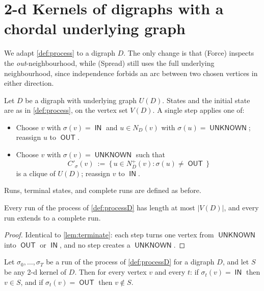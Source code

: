 \documentclass[11pt]{article}
\numberwithin{equation}{section}
\theoremstyle{plain}
\newcommand{\V}{V}
\newcommand{\Np}{N^{+}}
\newcommand{\und}{U}                       %
\newcommand{\st}{\sigma}                   %
\DeclareMathOperator{\IN}{\mathsf{IN}}
\DeclareMathOperator{\OUT}{\mathsf{OUT}}
\DeclareMathOperator{\UNK}{\mathsf{UNKNOWN}}
\begin{document}
\section{2-d Kernels of digraphs with a chordal underlying graph}
\label{sec:chordaldigraph}

We adapt \cref{def:process} to a digraph $D$. The only change is that (Force) inspects
the \emph{out}-neighbourhood, while (Spread) still uses the full underlying
neighbourhood, since independence forbids an arc between two chosen vertices in either
direction.

\begin{definition}\label{def:processD}
Let $D$ be a digraph with underlying graph $\und(D)$. States and the initial state are
as in \cref{def:process}, on the vertex set $\V(D)$. A single step applies one of:
\begin{itemize}[leftmargin=1.6em,itemsep=0.4ex]
\item[\textbf{(Spread$'$)}] Choose $v$ with $\st(v)=\IN$ and $u\in N_D(v)$ with
$\st(u)=\UNK$; reassign $u$ to $\OUT$.
\item[\textbf{(Force$'$)}] Choose $v$ with $\st(v)=\UNK$ such that
\[
  C'_\st(v)\ :=\ \{\,u\in \Np_D(v):\st(u)\neq\OUT\,\}
\]
is a clique of $\und(D)$; reassign $v$ to $\IN$.
\end{itemize}
Runs, terminal states, and complete runs are defined as before.
\end{definition}

\begin{lemma}\label{lem:terminateD}
Every run of the process of \cref{def:processD} has length at most $|\V(D)|$, and every
run extends to a complete run.
\end{lemma}

\begin{proof}
Identical to \cref{lem:terminate}: each step turns one vertex from $\UNK$ into $\OUT$ or
$\IN$, and no step creates a $\UNK$.
\end{proof}

\begin{lemma}\label{lem:soundD}
Let $\st_0,\dots,\st_T$ be a run of the process of \cref{def:processD} for a digraph
$D$, and let $S$ be any 2-d kernel of $D$. Then for every vertex $v$ and every $t$: if
$\st_t(v)=\IN$ then $v\in S$, and if $\st_t(v)=\OUT$ then $v\notin S$.
\end{lemma}
\end{document}
